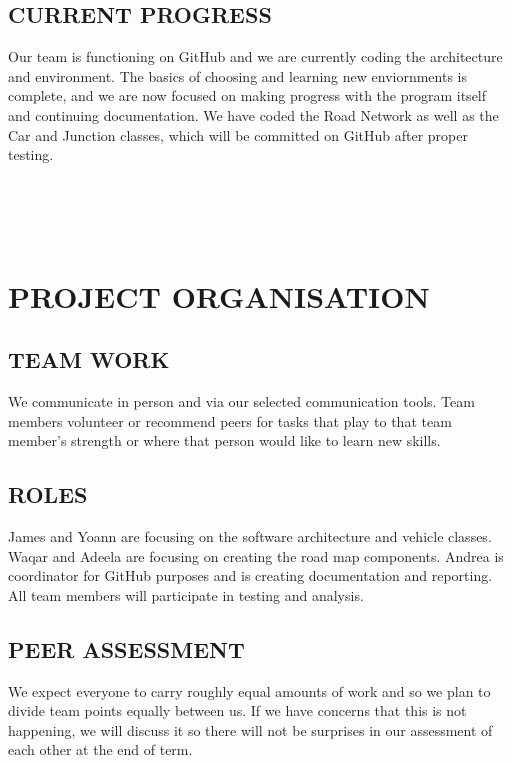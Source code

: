 \documentclass[11pt]{article}
\begin{document}
\subsection{CURRENT PROGRESS}

Our team is functioning on GitHub and we are currently coding the architecture and 
environment. The basics of choosing and learning new enviornments is complete, and we
are now focused on making progress with the program itself and continuing documentation. 
We have coded the Road Network as well as the Car and Junction classes, which will be committed on GitHub after proper testing.


\\ \\ \\

\section{PROJECT ORGANISATION}

\subsection{TEAM WORK}

We communicate in person and via our selected communication tools.  Team members 
volunteer or recommend peers for tasks that play to that team member's strength or where 
that person would like to learn new skills.


\subsection{ROLES}

James and Yoann are focusing on the software architecture and vehicle classes. Waqar and 
Adeela are focusing on creating the road map components. Andrea is coordinator for GitHub 
purposes and is creating documentation and reporting. All team members will participate 
in testing and analysis.


\subsection{PEER ASSESSMENT}

We expect everyone to carry roughly equal amounts of work and so we plan to divide team 
points equally between us. If we have concerns that this is not happening, we will 
discuss it so there will not be surprises in our assessment of each other at the end of term.
\end{document}
